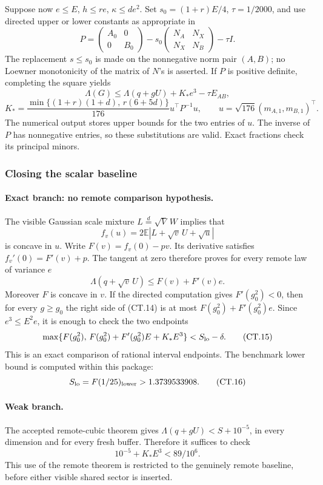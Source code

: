 Suppose now \(e\le E\), \(h\le re\), \(\kappa\le de^2\).
Set \(s_0=(1+r)E/4\), \(\tau=1/2000\), and use directed upper
or lower constants as appropriate in
\[
 P=\begin{pmatrix}A_0&0\\0&B_0\end{pmatrix}
 -s_0\begin{pmatrix}N_A&N_X\\N_X&N_B\end{pmatrix}-\tau I.
 \tag{CT.12}
\]
The replacement \(s\le s_0\) is made on the nonnegative norm pair
\((A,B)\); no Loewner monotonicity of the matrix of \(N\)'s is
asserted. If \(P\) is positive definite, completing the square yields
\[
 \Lambda(G)\le\Lambda(q+gU)+K_*e^3-\tau E_{AB},
\]
\[
 K_*=
 \frac{\min\{(1+r)(1+d),\,r(6+5d)\}}{176}
 u^\top P^{-1}u,\qquad
 u=\sqrt{176}(m_{A,1},m_{B,1})^\top.
 \tag{CT.13}
\]
The numerical output stores upper bounds for the two entries of \(u\).
The inverse of \(P\) has nonnegative entries, so these substitutions
are valid. Exact fractions check its principal minors.

\subsubsection{Closing the scalar baseline}
\paragraph{Exact branch: no remote comparison hypothesis.}
The visible Gaussian scale mixture \(L\overset d=\sqrt V\,W\)
implies that
\[
 f_v(u)=2\mathbb E|L+\sqrt v\,U+\sqrt u|
\]
is concave in \(u\). Write \(F(v)=f_v(0)-pv\).
Its derivative satisfies \(f_v'(0)=F'(v)+p\).
The tangent at zero therefore proves for every remote law of variance \(e\)
\[
 \Lambda(q+\sqrt v\,U)\le F(v)+F'(v)e.
 \tag{CT.14}
\]
Moreover \(F\) is concave in \(v\). If the directed computation gives
\(F'(g_0^2)<0\), then for every \(g\ge g_0\) the right side of
(CT.14) is at most \(F(g_0^2)+F'(g_0^2)e\).
Since \(e^3\le E^2e\), it is enough to check the two endpoints
\[
 \max\{F(g_0^2),\,
 F(g_0^2)+F'(g_0^2)E+K_*E^3\}<S_{\rm lo}-\delta.
 \tag{CT.15}
\]
This is an exact comparison of rational interval endpoints.
The benchmark lower bound is computed within this package:
\[
 S_{\rm lo}=F(1/25)_{\rm lower}>1.3739533908.
 \tag{CT.16}
\]

\paragraph{Weak branch.}
The accepted remote-cubic theorem gives
\(\Lambda(q+gU)<S+10^{-5}\), in every dimension and for every
fresh buffer. Therefore it suffices to check
\[
 10^{-5}+K_*E^3<89/10^6.
 \tag{CT.17}
\]
This use of the remote theorem is restricted to the genuinely
remote baseline, before either visible shared sector is inserted.

